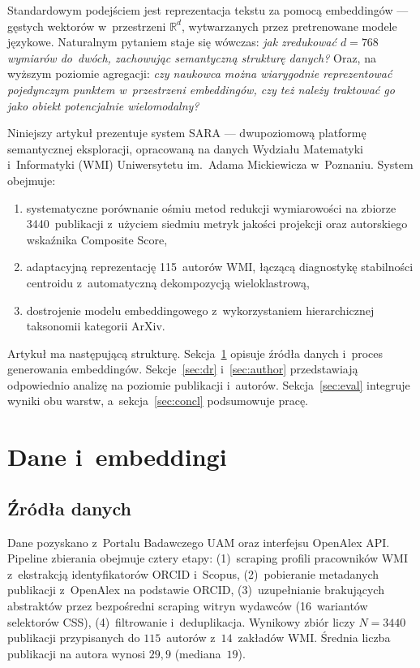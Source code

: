 \documentclass[a4paper,11pt,twocolumn]{article}
\begin{document}
Standardowym podejściem jest reprezentacja tekstu za pomocą embeddingów
--- gęstych wektorów w~przestrzeni $\mathbb{R}^d$, wytwarzanych przez
pretrenowane modele językowe. Naturalnym pytaniem staje się wówczas:
\emph{jak zredukować $d=768$ wymiarów do~dwóch, zachowując semantyczną
strukturę danych?} Oraz, na wyższym poziomie agregacji: \emph{czy
naukowca można wiarygodnie reprezentować pojedynczym punktem
w~przestrzeni embeddingów, czy też należy traktować go jako obiekt
potencjalnie wielomodalny?}

Niniejszy artykuł prezentuje system SARA --- dwupoziomową platformę
semantycznej eksploracji, opracowaną na danych Wydziału Matematyki
i~Informatyki (WMI) Uniwersytetu im.~Adama Mickiewicza w~Poznaniu.
System obejmuje:
\begin{enumerate}
  \item systematyczne porównanie ośmiu metod redukcji wymiarowości
        na zbiorze 3440~publikacji z~użyciem siedmiu metryk jakości
        projekcji oraz autorskiego wskaźnika Composite Score,
  \item adaptacyjną reprezentację 115~autorów WMI, łączącą diagnostykę
        stabilności centroidu z~automatyczną dekompozycją
        wieloklastrową,
  \item dostrojenie modelu embeddingowego z~wykorzystaniem hierarchicznej
        taksonomii kategorii ArXiv.
\end{enumerate}

Artykuł ma następującą strukturę. Sekcja~\ref{sec:data} opisuje źródła
danych i~proces generowania embeddingów. Sekcje~\ref{sec:dr}
i~\ref{sec:author} przedstawiają odpowiednio analizę na poziomie
publikacji i~autorów. Sekcja~\ref{sec:eval} integruje wyniki obu
warstw, a~sekcja~\ref{sec:concl} podsumowuje pracę.


\section{Dane i~embeddingi}
\label{sec:data}

\subsection{Źródła danych}

Dane pozyskano z~Portalu Badawczego UAM oraz interfejsu OpenAlex API.
Pipeline zbierania obejmuje cztery etapy: (1)~scraping profili pracowników
WMI z~ekstrakcją identyfikatorów ORCID i~Scopus, (2)~pobieranie metadanych
publikacji z~OpenAlex na podstawie ORCID, (3)~uzupełnianie brakujących
abstraktów przez bezpośredni scraping witryn wydawców (16~wariantów
selektorów CSS), (4)~filtrowanie i~deduplikacja. Wynikowy zbiór liczy
$N=3440$ publikacji przypisanych do $115$~autorów z~$14$~zakładów WMI.
Średnia liczba publikacji na autora wynosi $29{,}9$ (mediana~$19$).
\end{document}
